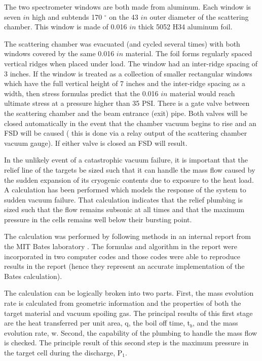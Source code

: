 \begin{safetyen}{10}{5}
The two spectrometer windows are both made from aluminum. Each window
is seven $in$ high and subtends 170 $^\circ$ on the 43 $in$ outer
diameter of the scattering chamber. This window is made of
0.016 $in$ thick 5052 H34 aluminum foil.

The scattering chamber was evacuated (and cycled several times)
with both windows covered by the same 0.016 $in$ material. 
The foil forms regularly spaced vertical ridges when
placed under load. The window had an inter-ridge
spacing of 3 inches.
If the window is treated as a collection
of smaller rectangular windows which have the full vertical height
of 7 inches and the inter-ridge spacing as a width,
then stress formulas predict that the 0.016 $in$
material would reach ultimate stress at a pressure higher than 35 PSI. 
There is a gate valve between the 
scattering chamber and the beam entrance (exit) 
pipe. Both 
valves will be closed automatically in the
event that the chamber vacuum begins to rise and an FSD will be caused
( this is done via a relay output of the scattering
chamber vacuum gauge). If either valve is closed an FSD will result.

In the unlikely event of a catastrophic vacuum failure, it
is important that the relief line of the targets be sized
such that it can handle the mass flow caused by the sudden
expansion of its cryogenic contents due to exposure to the
heat load. A calculation has been performed which
models the response of the system to sudden vacuum failure.
That calculation indicates that the relief plumbing is sized such that the
flow remains subsonic at all times and that the maximum pressure
in the cells remains well below their bursting point.

\end{safetyen}

The calculation was performed  by following methods in 
an internal report from the MIT Bates
laboratory \cite{bi:bates}. The formulas and algorithm in the report were
incorporated in two computer codes and those codes were able to reproduce
results in the report (hence they represent an accurate implementation
of the Bates calculation).

The calculation can be logically broken into two parts. First,
the mass evolution rate is calculated from geometric information
and the properties of both the target material and vacuum spoiling gas.
The principal results of this first stage are the heat transferred
per unit area, q, the boil off time, t$_b$, and the mass evolution rate, w.
Second, the capability of the plumbing to handle the mass flow
is checked. The principle result of this second step is the
maximum pressure in the target cell during the discharge, P$_1$.

